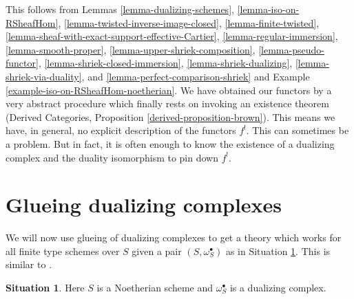 \documentclass{stacks-project}
\theoremstyle{plain}
\theoremstyle{definition}
\newtheorem{situation}[subsection]{Situation}
\theoremstyle{remark}
\numberwithin{equation}{subsection}
\begin{document}
This follows from Lemmas
\ref{lemma-dualizing-schemes},
\ref{lemma-iso-on-RSheafHom},
\ref{lemma-twisted-inverse-image-closed},
\ref{lemma-finite-twisted},
\ref{lemma-sheaf-with-exact-support-effective-Cartier},
\ref{lemma-regular-immersion},
\ref{lemma-smooth-proper},
\ref{lemma-upper-shriek-composition},
\ref{lemma-pseudo-functor},
\ref{lemma-shriek-closed-immersion},
\ref{lemma-shriek-dualizing},
\ref{lemma-shriek-via-duality}, and
\ref{lemma-perfect-comparison-shriek} and
Example \ref{example-iso-on-RSheafHom-noetherian}.
We have obtained our functors by a very abstract procedure
which finally rests on invoking an existence theorem
(Derived Categories, Proposition \ref{derived-proposition-brown}).
This means we have, in general, no explicit description of the functors $f^!$.
This can sometimes be a problem. But in fact, it is often enough to know
the existence of a dualizing complex and the duality isomorphism
to pin down $f^!$.






\section{Glueing dualizing complexes}
\label{section-glue}

\noindent
We will now use glueing of dualizing complexes to get a theory which works for
all finite type schemes over $S$ given a pair $(S, \omega_S^\bullet)$
as in Situation \ref{situation-dualizing}. This is similar to
\cite[Remark on page 310]{RD}.

\begin{situation}
\label{situation-dualizing}
Here $S$ is a Noetherian scheme and $\omega_S^\bullet$ is a dualizing
complex.
\end{situation}
\end{document}
